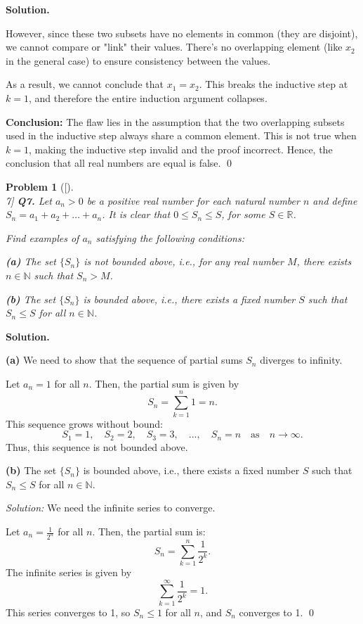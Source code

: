 \documentclass[12pt]{article}
\newtheorem{problemx}{Problem}
\newenvironment{problem}[1]{%
	\begin{problemx}[#1]\leavevmode\\[0.5em] %
	}{%
	\end{problemx}
}
\newenvironment{solution}{%
	\par\medskip
	\noindent\textbf{Solution.}\par\nopagebreak
}{%
	\hfill \qed \par\medskip
}
\begin{document}
\begin{solution}
		However, since these two subsets have no elements in common (they are disjoint), we cannot compare or "link" their values. There's no overlapping element (like \( x_2 \) in the general case) to ensure consistency between the values.
		
		As a result, we cannot conclude that \( x_1 = x_2 \). This breaks the inductive step at \( k = 1 \), and therefore the entire induction argument collapses.
		
		\textbf{Conclusion:}  
		The flaw lies in the assumption that the two overlapping subsets used in the inductive step always share a common element. This is not true when \( k = 1 \), making the inductive step invalid and the proof incorrect. Hence, the conclusion that all real numbers are equal is false.
	\end{solution}
	
	
	\begin{problem}[7]
		\textbf{Q7.} Let $a_n > 0$ be a positive real number for each natural number $n$ and define $S_n = a_1 + a_2 + \dots + a_n$. It is clear that $0 \leq S_n \leq S$, for some $S \in \mathbb{R}$.
		
		Find examples of $a_n$ satisfying the following conditions:
		
		\textbf{(a)} The set $\{S_n\}$ is not bounded above, i.e., for any real number $M$, there exists $n \in \mathbb{N}$ such that $S_n > M$.
		
		\textbf{(b)} The set $\{S_n\}$ is bounded above, i.e., there exists a fixed number $S$ such that $S_n \leq S$ for all $n \in \mathbb{N}$.
	\end{problem}
	
	\begin{solution}
		
		\textbf{(a)} We need to show that the sequence of partial sums $S_n$ diverges to infinity.
		
		Let $a_n = 1$ for all $n$. Then, the partial sum is given by
		$$S_n = \sum_{k=1}^{n} 1 = n.$$
		This sequence grows without bound:
		$$S_1 = 1, \quad S_2 = 2, \quad S_3 = 3, \quad \dots, \quad S_n = n \quad \text{as} \quad n \to \infty.$$
		Thus, this sequence is not bounded above.
		
		\textbf{(b)} The set $\{S_n\}$ is bounded above, i.e., there exists a fixed number $S$ such that $S_n \leq S$ for all $n \in \mathbb{N}$.
		
		\textit{Solution:} We need the infinite series to converge. 
		
		Let $a_n = \frac{1}{2^n}$ for all $n$. Then, the partial sum is:
		$$S_n = \sum_{k=1}^{n} \frac{1}{2^k}.$$
		The infinite series is given by
		$$\sum_{k=1}^{\infty} \frac{1}{2^k} = 1.$$
		This series converges to 1, so $S_n \leq 1$ for all $n$, and $S_n$ converges to 1.
	\end{solution}
	
\end{document}
